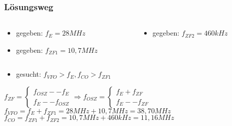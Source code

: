\begin{frame}
\frametitle{Lösungsweg}
\begin{columns}
    \begin{column}{0.48\textwidth}
    \begin{itemize}
  \item gegeben: $f_{E} = 28MHz$
  \item gegeben: $f_{ZF1} = 10,7MHz$
  \end{itemize}

    \end{column}
   \begin{column}{0.48\textwidth}
       \begin{itemize}
  \item gegeben: $f_{ZF2} = 460kHz$
  \end{itemize}

   \end{column}
\end{columns}

\begin{itemize}
  \item gesucht: $f_{VFO} \gt f_E, f_{CO} \gt f_{ZF1}$
  \end{itemize}
    \pause
    $f_{ZF} = \begin{cases}f_{OSZ} -- f_E\\ f_E -- f_{OSZ}\end{cases} \Rightarrow f_{OSZ} = \begin{cases}f_E + f_{ZF}\\ f_E -- f_{ZF}\end{cases}$
    \pause
    $f_{VFO} = f_E + f_{ZF1} = 28MHz + 10,7MHz = 38,70MHz$
    \pause
    $f_{CO} = f_{ZF1} + f_{ZF2} = 10,7MHz + 460kHz = 11,16MHz$



\end{frame}%
